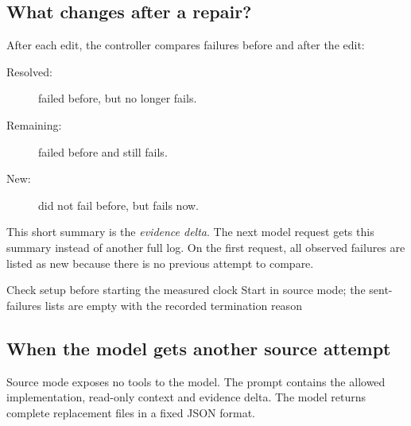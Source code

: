 \documentclass[10pt,twocolumn,a4paper]{article}
\begin{document}
\subsection{What changes after a repair?}
After each edit, the controller compares failures before and after the edit:
\begin{description}
\item[Resolved:] failed before, but no longer fails.
\item[Remaining:] failed before and still fails.
\item[New:] did not fail before, but fails now.
\end{description}
This short summary is the \emph{evidence delta}. The next model request gets
this summary instead of another full log. On the first request, all observed
failures are listed as new because there is no previous attempt to compare.

\begin{algorithm}[t]
\small
\caption{Lean repair with automatic tools fallback}
\label{alg:lean}
Check setup before starting the measured clock\;
Start in \textnormal{source} mode; the sent-failures lists are empty\;
\Stop with the recorded termination reason\;
\end{algorithm}

\subsection{When the model gets another source attempt}
Source mode exposes no tools to the model. The prompt contains the allowed
implementation, read-only context and evidence delta. The model returns
complete replacement files in a fixed JSON format.
\end{document}
